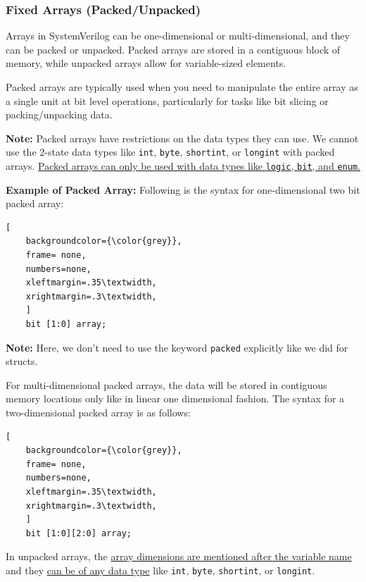 \documentclass[12pt, a4paper]{article}
\begin{document}
\subsubsection{Fixed Arrays (Packed/Unpacked)}

Arrays in SystemVerilog can be one-dimensional or multi-dimensional, and they can be packed or unpacked. Packed arrays are stored in a contiguous block of memory, while unpacked arrays allow for variable-sized elements. 

Packed arrays are typically used when you need to manipulate the entire array as a single unit at bit level operations, particularly for tasks like bit slicing or packing/unpacking data.

\textbf{Note:} Packed arrays have restrictions on the data types they can use. We cannot use the 2-state data types like \texttt{int}, \texttt{byte}, \texttt{shortint}, or \texttt{longint} with packed arrays. \ul{Packed arrays can only be used with data types like \texttt{logic}, \texttt{bit}, and \texttt{enum}.}

\vspace{1em}

\textbf{Example of Packed Array:} 
Following is the syntax for one-dimensional two bit packed array:
\begin{lstlisting}[
    backgroundcolor={\color{grey}},
    frame= none,
    numbers=none,
    xleftmargin=.35\textwidth,
    xrightmargin=.3\textwidth, 
    ]
    bit [1:0] array;
\end{lstlisting}

\textbf{Note:} Here, we don't need to use the keyword \texttt{packed} explicitly like we did for structs.

\vspace{0.5em}
For multi-dimensional packed arrays, the data will be stored in contiguous memory locations only like in linear one dimensional fashion. The syntax for a two-dimensional packed array is as follows:

\begin{lstlisting}[
    backgroundcolor={\color{grey}},
    frame= none,
    numbers=none,
    xleftmargin=.35\textwidth,
    xrightmargin=.3\textwidth, 
    ]
    bit [1:0][2:0] array;
\end{lstlisting}

In unpacked arrays, the \ul{ array dimensions are mentioned after the variable name} and they \ul{can be of any data type} like \texttt{int}, \texttt{byte}, \texttt{shortint}, or \texttt{longint}.
\end{document}
